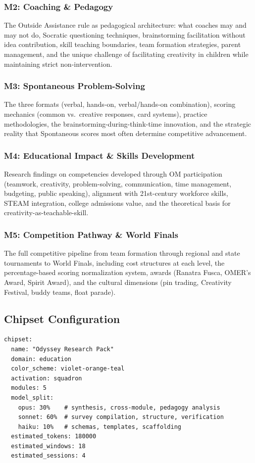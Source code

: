 \documentclass[11pt,letterpaper]{article}
\begin{document}
\subsubsection{M2: Coaching \& Pedagogy}
The Outside Assistance rule as pedagogical architecture: what coaches may and may not do, Socratic questioning techniques, brainstorming facilitation without idea contribution, skill teaching boundaries, team formation strategies, parent management, and the unique challenge of facilitating creativity in children while maintaining strict non-intervention.

\subsubsection{M3: Spontaneous Problem-Solving}
The three formats (verbal, hands-on, verbal/hands-on combination), scoring mechanics (common vs.\ creative responses, card systems), practice methodologies, the brainstorming-during-think-time innovation, and the strategic reality that Spontaneous scores most often determine competitive advancement.

\subsubsection{M4: Educational Impact \& Skills Development}
Research findings on competencies developed through OM participation (teamwork, creativity, problem-solving, communication, time management, budgeting, public speaking), alignment with 21st-century workforce skills, STEAM integration, college admissions value, and the theoretical basis for creativity-as-teachable-skill.

\subsubsection{M5: Competition Pathway \& World Finals}
The full competitive pipeline from team formation through regional and state tournaments to World Finals, including cost structures at each level, the percentage-based scoring normalization system, awards (Ranatra Fusca, OMER's Award, Spirit Award), and the cultural dimensions (pin trading, Creativity Festival, buddy teams, float parade).

\subsection{Chipset Configuration}

\begin{asciibox}
\begin{verbatim}
chipset:
  name: "Odyssey Research Pack"
  domain: education
  color_scheme: violet-orange-teal
  activation: squadron
  modules: 5
  model_split:
    opus: 30%    # synthesis, cross-module, pedagogy analysis
    sonnet: 60%  # survey compilation, structure, verification
    haiku: 10%   # schemas, templates, scaffolding
  estimated_tokens: 180000
  estimated_windows: 18
  estimated_sessions: 4
\end{verbatim}
\end{asciibox}
\end{document}
